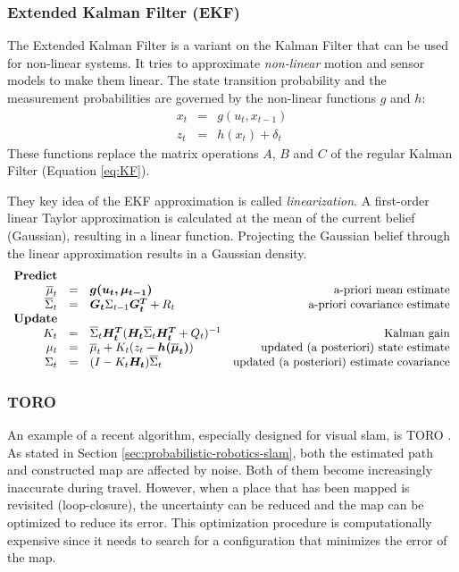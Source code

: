 \subsubsection{Extended Kalman Filter (EKF)}
\label{sec:prob-rob-ekf}
The Extended Kalman Filter is a variant on the Kalman Filter that can be used for non-linear systems.
It tries to approximate \textit{non-linear} motion and sensor models to make them linear.
The state transition probability and the measurement probabilities are governed by the non-linear functions $g$ and $h$:
\begin{equation}
\begin{array}{rcl}
x_t & = & g(u_t, x_{t-1}) \\
z_t & = & h(x_t) + \delta_t
\end{array}
\end{equation}
These functions replace the matrix operations $A$, $B$ and $C$ of the regular Kalman Filter (Equation \ref{eq:KF}).

They key idea of the EKF approximation is called \textit{linearization}.
A first-order linear Taylor approximation is calculated at the mean of the current belief (Gaussian), resulting in a linear function.
Projecting the Gaussian belief through the linear approximation results in a Gaussian density.
\begin{equation}
\begin{array}{rclr}
\text{\textbf{Predict}} \\
\overline{\mu}_t & = & \boldsymbol{g(u_t, \mu_{t-1})} & \text{a-priori mean estimate} \\
\overline{\Sigma}_t & = & \boldsymbol{G_t} \Sigma_{t-1} \boldsymbol{G_t^T} + R_t  & \text{a-priori covariance estimate} \\
\text{\textbf{Update}} \\
K_t & = & \overline{\Sigma}_t \boldsymbol{H_t^T} (\boldsymbol{H_t} \overline{\Sigma}_t \boldsymbol{H_t^T} + Q_t)^{-1} & \text{Kalman gain} \\
\mu_t & = & \overline{\mu}_t + K_t(z_t - \boldsymbol{h(\overline{\mu}_t)}) & \text{updated (a posteriori) state estimate} \\
\Sigma_t & = & (I - K_t \boldsymbol{H_t}) \overline{\Sigma}_t & \text{updated (a posteriori) estimate covariance}
\end{array}
\end{equation}



\subsubsection{TORO}
\label{sec:prob-rob-toro}
An example of a recent algorithm, especially designed for visual slam, is TORO \cite{grisetti2007efficient}.
As stated in Section \ref{sec:probabilistic-robotics-slam}, both the estimated path and constructed map are affected by noise.
Both of them become increasingly inaccurate during travel.
However, when a place that has been mapped is revisited (loop-closure), the uncertainty can be reduced and the map can be optimized to reduce its error.
This optimization procedure is computationally expensive since it needs to search for a configuration that minimizes the error of the map.

